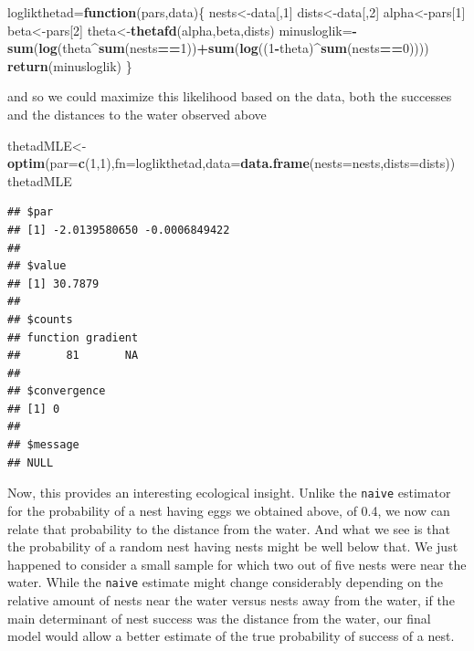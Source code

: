 \documentclass[
]{book}
\newenvironment{Shaded}{\begin{snugshade}}{\end{snugshade}}
\newcommand{\ControlFlowTok}[1]{\textcolor[rgb]{0.13,0.29,0.53}{\textbf{#1}}}
\newcommand{\DataTypeTok}[1]{\textcolor[rgb]{0.13,0.29,0.53}{#1}}
\newcommand{\DecValTok}[1]{\textcolor[rgb]{0.00,0.00,0.81}{#1}}
\newcommand{\KeywordTok}[1]{\textcolor[rgb]{0.13,0.29,0.53}{\textbf{#1}}}
\newcommand{\NormalTok}[1]{#1}
\newcommand{\OperatorTok}[1]{\textcolor[rgb]{0.81,0.36,0.00}{\textbf{#1}}}
\begin{document}
\begin{Shaded}
\begin{Highlighting}[]
\NormalTok{loglikthetad=}\ControlFlowTok{function}\NormalTok{(pars,data)\{}
\NormalTok{  nests<-data[,}\DecValTok{1}\NormalTok{]}
\NormalTok{  dists<-data[,}\DecValTok{2}\NormalTok{]}
\NormalTok{  alpha<-pars[}\DecValTok{1}\NormalTok{]}
\NormalTok{  beta<-pars[}\DecValTok{2}\NormalTok{]}
\NormalTok{  theta<-}\KeywordTok{thetafd}\NormalTok{(alpha,beta,dists)}
\NormalTok{  minusloglik=}\OperatorTok{-}\KeywordTok{sum}\NormalTok{(}\KeywordTok{log}\NormalTok{(theta}\OperatorTok{^}\KeywordTok{sum}\NormalTok{(nests}\OperatorTok{==}\DecValTok{1}\NormalTok{))}\OperatorTok{+}\KeywordTok{sum}\NormalTok{(}\KeywordTok{log}\NormalTok{((}\DecValTok{1}\OperatorTok{-}\NormalTok{theta)}\OperatorTok{^}\KeywordTok{sum}\NormalTok{(nests}\OperatorTok{==}\DecValTok{0}\NormalTok{))))}
  \KeywordTok{return}\NormalTok{(minusloglik)}
\NormalTok{\}}
\end{Highlighting}
\end{Shaded}

and so we could maximize this likelihood based on the data, both the successes and the distances to the water observed above

\begin{Shaded}
\begin{Highlighting}[]
\NormalTok{thetadMLE<-}\KeywordTok{optim}\NormalTok{(}\DataTypeTok{par=}\KeywordTok{c}\NormalTok{(}\DecValTok{1}\NormalTok{,}\DecValTok{1}\NormalTok{),}\DataTypeTok{fn=}\NormalTok{loglikthetad,}\DataTypeTok{data=}\KeywordTok{data.frame}\NormalTok{(}\DataTypeTok{nests=}\NormalTok{nests,}\DataTypeTok{dists=}\NormalTok{dists))}
\NormalTok{thetadMLE}
\end{Highlighting}
\end{Shaded}

\begin{verbatim}
## $par
## [1] -2.0139580650 -0.0006849422
## 
## $value
## [1] 30.7879
## 
## $counts
## function gradient 
##       81       NA 
## 
## $convergence
## [1] 0
## 
## $message
## NULL
\end{verbatim}

Now, this provides an interesting ecological insight. Unlike the \texttt{naive} estimator for the probability of a nest having eggs we obtained above, of 0.4, we now can relate that probability to the distance from the water. And what we see is that the probability of a random nest having nests might be well below that. We just happened to consider a small sample for which two out of five nests were near the water. While the \texttt{naive} estimate might change considerably depending on the relative amount of nests near the water versus nests away from the water, if the main determinant of nest success was the distance from the water, our final model would allow a better estimate of the true probability of success of a nest.
\end{document}
